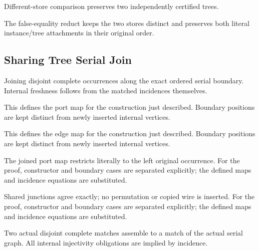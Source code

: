 Different-store comparison preserves two independently certified trees.
\par{}

The false-equality reduct keeps the two stores distinct and preserves both literal instance/tree attachments in their original order.
\par{}

\subsection{Sharing Tree Serial Join}
Joining disjoint complete occurrences along the exact ordered serial boundary. Internal freshness follows from the matched incidences themselves.

This defines the port map for the construction just described. Boundary positions are kept distinct from newly inserted internal vertices.
\par{}

This defines the edge map for the construction just described. Boundary positions are kept distinct from newly inserted internal vertices.
\par{}

The joined port map restricts literally to the left original occurrence.
For the proof, constructor and boundary cases are separated explicitly; the defined maps and incidence equations are substituted.
\par{}

Shared junctions agree exactly; no permutation or copied wire is inserted.
For the proof, constructor and boundary cases are separated explicitly; the defined maps and incidence equations are substituted.
\par{}

Two actual disjoint complete matches assemble to a match of the actual serial graph. All internal injectivity obligations are implied by incidence.
\par{}

